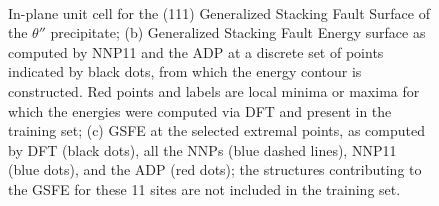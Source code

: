 \documentclass{article}
\begin{document}
\begin{figure}[H]%
\centering%
%
%
\\
%
\caption{
In-plane unit cell for the (111) Generalized Stacking Fault Surface of the $\theta''$ precipitate; (b) Generalized Stacking Fault Energy surface as computed by NNP11 and the ADP at a discrete set of points indicated by black dots, from which the energy contour is constructed.  Red points and labels are local minima or maxima for which the energies were computed via DFT and present in the training set; (c) GSFE at the selected extremal points, as computed by DFT (black dots), all the NNPs (blue dashed lines), NNP11 (blue dots), and the ADP (red dots); the structures contributing to the GSFE for these 11 sites are not included in the training set.
}
\label{fig:GSF_ThetaDP_111}
\end{figure}
\end{document}
